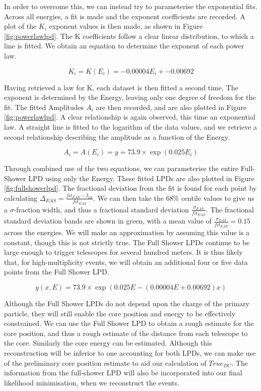 \documentclass[11pt]{article}
\begin{document}
In order to overcome this, we can instead try to parameterise the exponential fits. Across all energies, a fit is made and the exponent coefficients are recorded. A plot of the $K_{i}$ exponent values is then made, as shown in Figure  \ref{fig:powerlawlpd}. The K coefficients follow a clear linear distribution, to which a line is fitted. We obtain an equation to determine the exponent of each power law. 

\[ K_{i} = K(E_{i}) = -0.00004 E_{i} + -0.00692 \]

Having retrieved a law for K, each dataset is then fitted a second time. The exponent is determined by the Energy, leaving only one degree of freedom for the fit. The fitted Amplitudes $A_{i}$ are then recorded, and are also plotted in Figure \ref{fig:powerlawlpd}. A clear relationship is again observed, this time an exponential law. A straight line is fitted to the logarithm of the data values, and we retrieve a second relationship describing the amplitude as a function of the Energy.

\[ A_{i} = A(E_{i}) =y =73.9 \times \exp (0.025 E_{i}) \]

Through combined use of the two equations, we can parameterise the entire Full-Shower LPD using only the Energy. These fitted LPDs are also plotted in Figure \ref{fig:fullshowerlpd}. The fractional deviation from the fit is found for each point by calculating $\Delta_{EAS} = \frac{fit_{EAS} - I_{tot}}{fit_{EAS}}$. We can then take the 68\% centile values to give us a $\sigma$-fraction width, and thus a fractional standard deviation $\frac{\sigma_{EAS}}{fit_{EAS}}$. The fractional standard deviation bands are shown in green, with a mean value of $\frac{\sigma_{EAS}}{fit_{EAS}}=0.15$ across the energies. We will make an approximation by assuming this value is a constant, though this is not strictly true. The Full Shower LPDs continue to be large enough to trigger telescopes for several hundred meters. It is thus likely that, for high-multiplicity events, we will obtain an additional four or five data points from the Full Shower LPD.

\[ y (x, E) = 73.9 \times \exp (0.025 E -(0.00004 E + 0.00692)x) \]

Although the Full Shower LPDs do not depend upon the charge of the primary particle, they will still enable the core position and energy to be effectively constrained. We can use the Full Shower LPD to obtain a rough estimate for the core position, and thus a rough estimate of the distance from each telescope to the core. Similarly the core energy can be estimated. Although this reconstruction will be inferior to one accounting for both LPDs, we can make use of the preliminary core position estimate to aid our calculation of $True_{DC}$. The information from the full-shower LPD will also be incorporated into our final likelihood minimisation, when we reconstruct the events.
\end{document}
